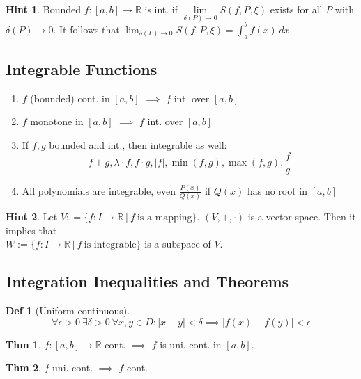 \documentclass[a4paper, 10pt]{article}
\theoremstyle{definition}
\newtheorem*{theorem}{Thm}
\newtheorem*{definition}{Def}
\newtheorem*{note_wrapper}{Hint}
\theoremstyle{ex}
\theoremstyle{named}
\newenvironment{note}%
    {\begin{mdframed}[style=trick]\begin{note_wrapper}}%
    {\end{note_wrapper}\end{mdframed}}
\newcommand{\R}{\mathbb{R}}
\begin{document}
\begin{note}
    Bounded $f: [a, b] \to \R$ is int. if $\lim\limits_{\delta(P) \to 0} S(f, P, \xi)$ exists for all $P$ with $\delta(P) \to 0$. It follows that \newline $\lim_{\delta(P) \to 0} S(f, P, \xi) = \int_a^b f(x) \,dx$
\end{note}

\subsection{Integrable Functions}
\begin{enumerate}
    \item $f$ (bounded) cont. in $[a, b]$ $\implies$ $f$ int. over $[a, b]$
    \item $f$ monotone in $[a, b]$ $\implies$ $f$ int. over $[a, b]$
    \item If $f, g$ bounded and int., then integrable as well:
    $$f + g, \lambda \cdot f, f \cdot g, |f|, \min(f, g), \max(f,g), \frac{f}{g}$$
    \item All polynomials are integrable, even $\frac{P(x)}{Q(x)}$ if $Q(x)$ has no root in $[a, b]$
\end{enumerate}

\begin{note}
    Let $V: = \{f: I \to \R \ | \ f \ \text{is a mapping}\}$. $(V, +, \cdot)$ is a vector space.
    Then it implies that \\
    $W := \{f: I \to \R \ | \ f \ \text{is integrable}\}$ is a subspace of $V$.
\end{note}

\subsection{Integration Inequalities and Theorems}
\begin{definition}[Uniform continuous]
    $$\forall \epsilon > 0 \ \exists \delta > 0 \ \forall x,y \in D: |x - y| < \delta \implies |f(x) - f(y)| < \epsilon $$
\end{definition}

\begin{theorem}
    $f: [a, b] \to \R$ cont. $\implies$ $f$ is uni. cont. in $[a, b]$.
\end{theorem}

\begin{theorem}
    $f$ uni. cont. $\implies$ $f$ cont.
\end{theorem}
\end{document}
